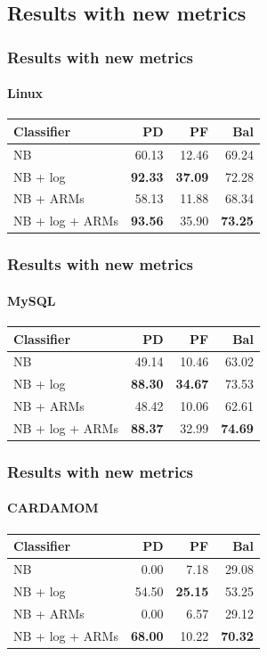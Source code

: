\documentclass{beamer}
\begin{document}
\subsection{Results with new metrics}
\begin{frame}
 \frametitle{Results with new metrics}
 \framesubtitle{Linux}
 \begin{center}
 \begin{tabular}{lrrr}
  \hspace{0.2cm} Classifier & PD & PF & Bal\\
  \hline
  NB & 60.13 & 12.46 & 69.24\\
  NB + log &  \textbf{92.33} & \textbf{37.09} & 72.28\\
  NB + ARMs & 58.13 & 11.88 & 68.34\\
  NB + log + ARMs & \textbf{93.56} & 35.90 & \textbf{73.25}\\
  \hline
 \end{tabular}
 \end{center}
\end{frame}

\begin{frame}
 \frametitle{Results with new metrics}
 \framesubtitle{MySQL}
 \begin{center}
 \begin{tabular}{lrrr}
  \hspace{0.2cm} Classifier & PD & PF & Bal\\
  \hline
  NB & 49.14 & 10.46 & 63.02\\
  NB + log &  \textbf{88.30} & \textbf{34.67} & 73.53\\
  NB + ARMs & 48.42 & 10.06 & 62.61\\
  NB + log + ARMs & \textbf{88.37} & 32.99 & \textbf{74.69}\\
  \hline
 \end{tabular}
 \end{center}
\end{frame}

\begin{frame}
 \frametitle{Results with new metrics}
 \framesubtitle{CARDAMOM}
 \begin{center}
 \begin{tabular}{lrrr}
  \hspace{0.2cm} Classifier & PD & PF & Bal\\
  \hline
  NB & 0.00 & 7.18 & 29.08\\
  NB + log & 54.50 & \textbf{25.15} & 53.25\\
  NB + ARMs & 0.00 & 6.57 & 29.12\\
  NB + log + ARMs & \textbf{68.00} & 10.22 & \textbf{70.32}\\
  \hline
 \end{tabular}
 \end{center}
\end{frame}
\end{document}
